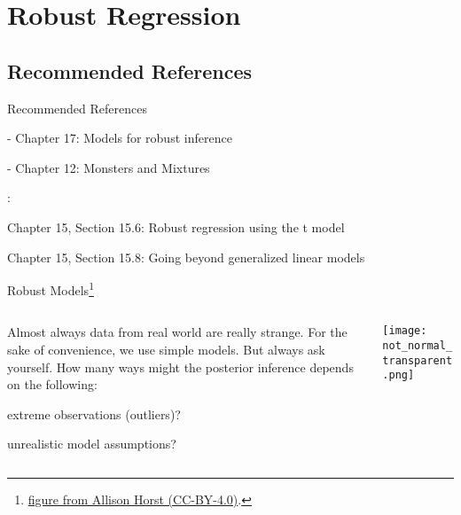 \section{Robust Regression}

\subsection{Recommended References}
\begin{frame}{Recommended References}
	\begin{vfilleditems}
		\item \textcite{gelman2013bayesian} - Chapter 17: Models for robust inference
		\item \textcite{mcelreath2020statistical} - Chapter 12: Monsters and Mixtures
		\item \textcite{gelman2020regression}:
		\begin{vfilleditems}
			\item Chapter 15, Section 15.6: Robust regression using the t model
			\item Chapter 15, Section 15.8: Going beyond generalized linear models
		\end{vfilleditems}
	\end{vfilleditems}
\end{frame}

\begin{frame}{Robust Models\footnote{\href{https://github.com/allisonhorst/stats-illustrations}{figure from Allison Horst (CC-BY-4.0)}.}}
	\begin{columns}
		\begin{column}{0.6\textwidth}
			Almost always data from real world are really strange.
			\vfill
			For the sake of convenience, we use simple models.
			But always ask yourself.
			How many ways might the posterior inference depends on the following:
			\vfill
			\begin{vfilleditems}
				\item extreme observations (outliers)?
				\item unrealistic model assumptions?
			\end{vfilleditems}
		\end{column}
		\begin{column}{0.4\textwidth}
			\texttt{[image: not\_normal\_transparent.png]}
		\end{column}
	\end{columns}
\end{frame}

